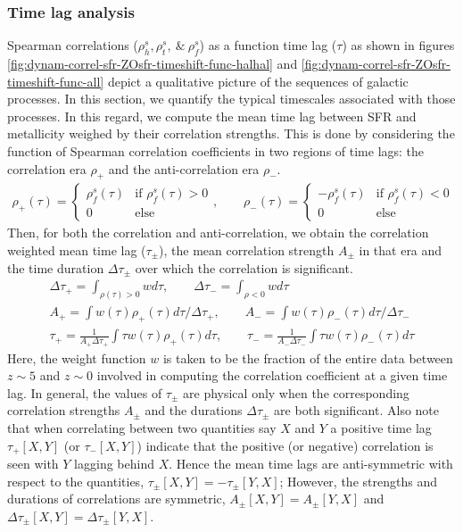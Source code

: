 \subsubsection{Time lag analysis}
\label{sec:time-lag-analysis}
Spearman correlations ($\rho^s_h, \rho^s_t, ~\&~ \rho^s_f$) as a function time lag ($\tau$) as shown in figures \ref{fig:dynam-correl-sfr-ZOsfr-timeshift-func-halhal} and \ref{fig:dynam-correl-sfr-ZOsfr-timeshift-func-all} depict a qualitative picture of the sequences of galactic processes. In this section, we quantify the typical timescales associated with those processes. In this regard, we compute the mean time lag between SFR and metallicity weighed by their correlation strengths. This is done by considering the function of Spearman correlation coefficients in two regions of time lags: the correlation era $\rho_{+}$ and the anti-correlation era $\rho_{-}$.
\begin{gather}
\rho_{+}(\tau) = 
\begin{cases} 
\rho^s_f(\tau) & \text{if } \rho^s_f(\tau) > 0 \\ 
0 & \text{else} 
\end{cases}, \qquad
\rho_{-}(\tau) = 
\begin{cases} 
-\rho^s_f(\tau) & \text{if } \rho^s_f(\tau) < 0 \\
0 & \text{else} 
\end{cases}
\end{gather}
Then, for both the correlation and anti-correlation, we obtain the correlation weighted mean time lag ($\tau_{\pm}$), the mean correlation strength $A_{\pm}$ in that era and the time duration $\Delta\tau_{\pm}$
over which the correlation is significant.
\begin{gather}
\Delta\tau_{+} = \int_{\rho(\tau)>0} w d\tau , \qquad \Delta\tau_{-} = \int_{\rho<0} w d\tau   \\
A_{+} = \int w(\tau) \rho_{+}(\tau) d\tau / \Delta\tau_{+}, \qquad A_{-} = \int w(\tau) \rho_{-}(\tau) d\tau / \Delta\tau_{-} \\
\tau_{+} = \frac{1}{A_{+} \Delta\tau_{+}} \int \tau w(\tau) \rho_{+}(\tau) d\tau , \qquad \tau_{-} = \frac{1}{A_{-}\Delta\tau_{-}} \int \tau w(\tau) \rho_{-}(\tau) d\tau     
\end{gather}
Here, the weight function $w$ is taken to be the fraction of the entire data between $z \sim 5$ and $z \sim 0$ involved in computing the correlation coefficient at a given time lag. In general, the values of $\tau_{\pm}$ are physical only when the corresponding correlation strengths $A_{\pm}$ and the durations $\Delta \tau_{\pm}$ are both significant. Also note that when correlating between two quantities say $X$ and $Y$ a positive time lag $\tau_{+}[X,Y]$ (or $\tau_{-}[X,Y]$) indicate that the positive (or negative) correlation is seen with $Y$ lagging behind $X$. Hence the mean time lags are anti-symmetric with respect to the quantities, $\tau_{\pm}[X,Y]= - \tau_{\pm}[Y,X]$; However, the strengths and durations of correlations are symmetric, $A_{\pm}[X,Y]= A_{\pm}[Y,X]$ and $\Delta \tau_{\pm}[X,Y]= \Delta \tau_{\pm}[Y,X]$.

